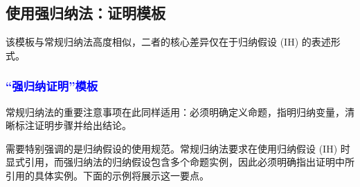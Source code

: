 \subsection{使用强归纳法：证明模板}

该模板与常规归纳法高度相似，二者的核心差异仅在于归纳假设 (IH) 的表述形式。

\subsubsection*{\textcolor{blue}{``强归纳证明''模板}}

\setlength{\fboxrule}{2pt}
\setlength\fboxsep{5mm}
\begin{center}
\noindent {}
\end{center}

常规归纳法的重要注意事项在此同样适用：必须明确定义命题，指明归纳变量，清晰标注证明步骤并给出结论。

需要特别强调的是归纳假设的使用规范。常规归纳法要求在使用归纳假设 (IH) 时显式引用，而强归纳法的归纳假设包含多个命题实例，因此必须明确指出证明中所引用的具体实例。下面的示例将展示这一要点。
